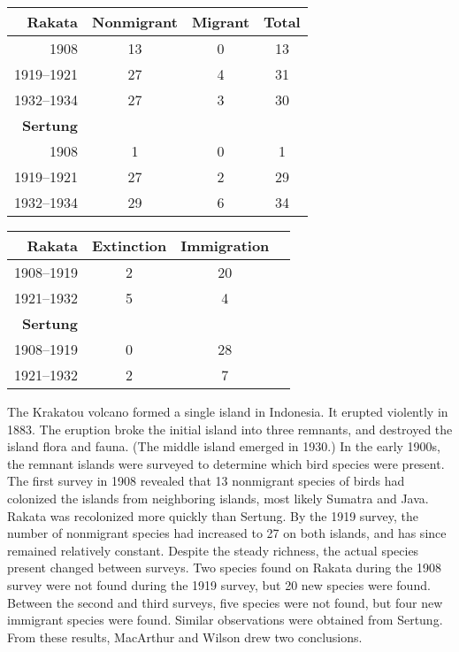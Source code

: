 \documentclass{tufte-handout}
\begin{document}
\begin{margintable}
	\begin{tabular}{rccc}
		\toprule
		\textbf{Rakata} & Nonmigrant & Migrant & Total\\
		\midrule
		1908 & 13 & 0 & 13 \\
		1919--1921 & 27 & 4 & 31 \\
		1932--1934 & 27 & 3 & 30 \\
		\midrule
		\textbf{Sertung}&  &  & \\
		\midrule
		1908 & 1 & 0 & 1 \\
		1919--1921 & 27 & 2 & 29\\
		1932--1934 & 29 & 6 & 34\\
		\bottomrule
	\end{tabular}
\end{margintable}

\begin{margintable}
	\begin{tabular}{rccc}
		\toprule
		\textbf{Rakata} & Extinction & Immigration\\
		\midrule
		1908--1919 & 2 & 20 \\
		1921--1932 & 5 & 4  \\
		\midrule
		\textbf{Sertung}&  & \\
		\midrule
		1908--1919 & 0 & 28 \\
		1921--1932 & 2 & 7  \\
		\bottomrule
	\end{tabular}
\end{margintable}

The Krakatou volcano formed a single island in Indonesia.  It erupted violently in 1883.  The eruption broke the initial island into three remnants, and destroyed the island flora and fauna. (The middle island emerged in 1930.) In the early 1900s, the remnant islands were surveyed to determine which bird species were present.
The first survey in 1908 revealed that 13 nonmigrant species of birds had colonized the islands from neighboring islands, most likely Sumatra and Java.  Rakata was recolonized more quickly than Sertung. By the 1919 survey, the number of nonmigrant species had increased to 27 on both islands, and has since remained relatively constant. Despite the steady richness, the actual species present changed between surveys. Two species found on Rakata during the 1908 survey were not found during the 1919 survey, but 20 new species were found. Between the second and third surveys, five species were not found, but four new immigrant species were found. Similar observations were obtained from Sertung. From these results, MacArthur and Wilson drew two conclusions.
\end{document}
